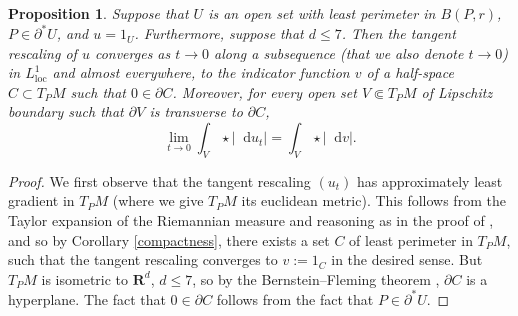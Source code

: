 \documentclass[reqno,10pt]{amsart}
\newcommand{\RR}{\mathbf{R}}
\newcommand*\dif{\mathop{}\!\mathrm{d}}
\newcommand{\loc}{\mathrm{loc}}
\newcommand{\cpt}{\mathrm{cpt}}
\newtheorem{proposition}[theorem]{Proposition}
\theoremstyle{definition}
\numberwithin{equation}{section}
\begin{document}
\begin{proposition}\label{blowup theorem}
Suppose that $U$ is an open set with least perimeter in $B(P, r)$, $P \in \partial^* U$, and $u = 1_U$.
Furthermore, suppose that $d \leq 7$.
Then the tangent rescaling of $u$ converges as $t \to 0$ along a subsequence (that we also denote $t \to 0$) in $L^1_\loc$ and almost everywhere, to the indicator function $v$ of a half-space $C \subset T_PM$ such that $0 \in \partial C$.
Moreover, for every open set $V \Subset T_PM$ of Lipschitz boundary such that $\partial V$ is transverse to $\partial C$,
$$\lim_{t \to 0} \int_V \star |\dif u_t| = \int_V \star |\dif v|.$$
\end{proposition}
\begin{proof}
We first observe that the tangent rescaling $(u_t)$ has approximately least gradient in $T_PM$ (where we give $T_PM$ its euclidean metric).
This follows from the Taylor expansion of the Riemannian measure and reasoning as in the proof of \cite[Theorem 9.3]{Giusti77}, and so by Corollary \ref{compactness}, there exists a set $C$ of least perimeter in $T_PM$, such that the tangent rescaling converges to $v := 1_C$ in the desired sense.
But $T_PM$ is isometric to $\RR^d$, $d \leq 7$, so by the Bernstein--Fleming theorem \cite[Theorem 17.3]{Giusti77}, $\partial C$ is a hyperplane.
The fact that $0 \in \partial C$ follows from the fact that $P \in \partial^* U$.
\end{proof}
\end{document}
